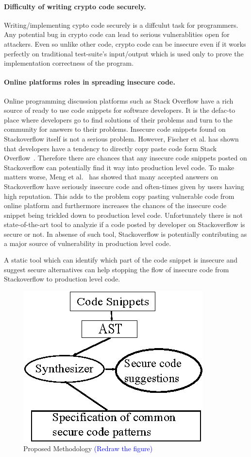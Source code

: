 \documentclass[sigconf]{acmart}
\begin{document}
\paragraph{Difficulty of writing crypto code securely.} Writing/implementing cypto code securely is a diffculut task for programmers. Any potential bug in crypto code can lead to serious vulnerablities open for attackers.
Even so unlike other code, crypto code can be insecure even if it works 
perfectly on traditional test-suite's input/output which is used only to prove the implementation correctness of the program.

\paragraph{Online platforms roles in spreading insecure code.} Online programming discussion platforms such as Stack Overflow have a rich source of ready to use code snippets for software developers. It is the defac-to place where developers go to find solutions of their problems and turn to the community for answers to their problems. 
Insecure code snippets found on Stackoverflow itself is not a serious problem. However,  
Fischer et al. has shown that developers have a tendency to directly copy paste code form Stack Overflow~\cite{fischer2017stack}. Therefore there are chances that any insecure code snippets posted on Stackoverflow can potentially find it way into production level code. To make matters worse, Meng et al.~\cite{meng2018secure} has showed that many accepted answers on Stackoverflow have seriously insecure code and often-times given by users having high reputation. This adds to the problem copy pasting vulnerable code from online platform and furthermore increases the chances of the insecure code snippet being trickled down to production level code. 
Unfortunately there is not state-of-the-art tool to analyzie if a code posted by developer on Stackoverflow is secure or not. In absense of such tool, Stackoverflow is potentially contributing as a major source of vulnerability in production level code.  

A static tool which can identify which part of the code snippet is insecure and suggest secure alternatives can help stopping the flow of insecure code from Stackoverflow to production level code.
\begin{figure}
  \includegraphics[width=0.5\linewidth]{Figures/workflow.eps}
  \caption{Proposed Methodology \textcolor{blue}{(Redraw the figure)}}
\end{figure}
\end{document}
